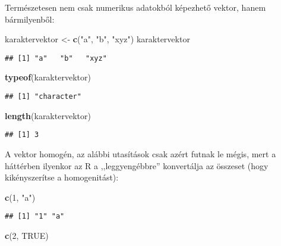 \documentclass[
]{book}
\newenvironment{Shaded}{\begin{snugshade}}{\end{snugshade}}
\newcommand{\DecValTok}[1]{\textcolor[rgb]{0.00,0.00,0.81}{#1}}
\newcommand{\KeywordTok}[1]{\textcolor[rgb]{0.13,0.29,0.53}{\textbf{#1}}}
\newcommand{\NormalTok}[1]{#1}
\newcommand{\OtherTok}[1]{\textcolor[rgb]{0.56,0.35,0.01}{#1}}
\newcommand{\StringTok}[1]{\textcolor[rgb]{0.31,0.60,0.02}{#1}}
\begin{document}
Természetesen nem csak numerikus adatokból képezhető vektor, hanem bármilyenből:

\begin{Shaded}
\begin{Highlighting}[]
\NormalTok{karaktervektor <-}\StringTok{ }\KeywordTok{c}\NormalTok{(}\StringTok{"a"}\NormalTok{, }\StringTok{"b"}\NormalTok{, }\StringTok{"xyz"}\NormalTok{)}
\NormalTok{karaktervektor}
\end{Highlighting}
\end{Shaded}

\begin{verbatim}
## [1] "a"   "b"   "xyz"
\end{verbatim}

\begin{Shaded}
\begin{Highlighting}[]
\KeywordTok{typeof}\NormalTok{(karaktervektor)}
\end{Highlighting}
\end{Shaded}

\begin{verbatim}
## [1] "character"
\end{verbatim}

\begin{Shaded}
\begin{Highlighting}[]
\KeywordTok{length}\NormalTok{(karaktervektor)}
\end{Highlighting}
\end{Shaded}

\begin{verbatim}
## [1] 3
\end{verbatim}

A vektor homogén, az alábbi utasítások csak azért futnak le mégis, mert a háttérben ilyenkor az R a ,,leggyengébbre'' konvertálja az összeset (hogy kikényszerítse a homogenitást):

\begin{Shaded}
\begin{Highlighting}[]
\KeywordTok{c}\NormalTok{(}\DecValTok{1}\NormalTok{, }\StringTok{"a"}\NormalTok{)}
\end{Highlighting}
\end{Shaded}

\begin{verbatim}
## [1] "1" "a"
\end{verbatim}

\begin{Shaded}
\begin{Highlighting}[]
\KeywordTok{c}\NormalTok{(}\DecValTok{2}\NormalTok{, }\OtherTok{TRUE}\NormalTok{)}
\end{Highlighting}
\end{Shaded}
\end{document}
